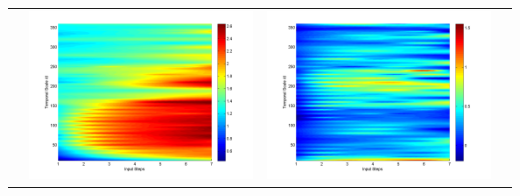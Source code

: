 \documentclass[11pt]{article}
\begin{document}
\begin{table}[H]
{\begin{tabular}{cccc}
&\begin{minipage}{.3\textwidth}\includegraphics[width=\linewidth]{resultgraph/11532500p.png}\end{minipage}
&\begin{minipage}{.3\textwidth}\includegraphics[width=\linewidth]{resultgraph/11532500diff_ep.png}\end{minipage}

\end{tabular}}
\end{table}
\end{document}
